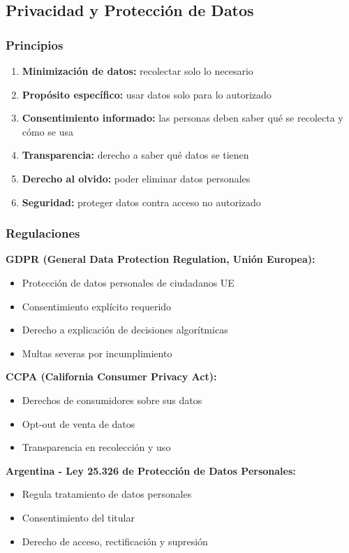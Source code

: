 \documentclass[11pt,a4paper]{article}
\begin{document}
\subsection{Privacidad y Protección de Datos}

\subsubsection{Principios}

\begin{enumerate}
\item \textbf{Minimización de datos:} recolectar solo lo necesario
\item \textbf{Propósito específico:} usar datos solo para lo autorizado
\item \textbf{Consentimiento informado:} las personas deben saber qué se recolecta y cómo se usa
\item \textbf{Transparencia:} derecho a saber qué datos se tienen
\item \textbf{Derecho al olvido:} poder eliminar datos personales
\item \textbf{Seguridad:} proteger datos contra acceso no autorizado
\end{enumerate}

\subsubsection{Regulaciones}

\textbf{GDPR (General Data Protection Regulation, Unión Europea):}
\begin{itemize}
\item Protección de datos personales de ciudadanos UE
\item Consentimiento explícito requerido
\item Derecho a explicación de decisiones algorítmicas
\item Multas severas por incumplimiento
\end{itemize}

\textbf{CCPA (California Consumer Privacy Act):}
\begin{itemize}
\item Derechos de consumidores sobre sus datos
\item Opt-out de venta de datos
\item Transparencia en recolección y uso
\end{itemize}

\textbf{Argentina - Ley 25.326 de Protección de Datos Personales:}
\begin{itemize}
\item Regula tratamiento de datos personales
\item Consentimiento del titular
\item Derecho de acceso, rectificación y supresión
\end{itemize}
\end{document}
